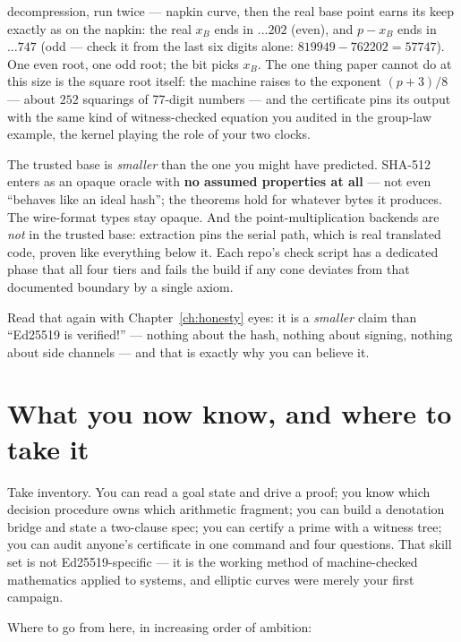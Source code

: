 \begin{worked}{decompression, run twice --- napkin curve, then the real base point}
earns its keep exactly as on the napkin: the real
$x_B$ ends in $\ldots 202$ (even), and $p - x_B$ ends in $\ldots 747$
(odd --- check it from the last six digits alone: $819949 - 762202 =
57747$). One even root, one odd root; the bit picks $x_B$. The one thing
paper cannot do at this size is the square root itself: the machine
raises to the exponent $(p+3)/8$ --- about $252$ squarings of 77-digit
numbers --- and the certificate  pins its
output with the same kind of witness-checked equation you audited in the
group-law example, the kernel playing the role of your two clocks.
\end{worked}

The trusted base is \emph{smaller} than the one you might have predicted.
SHA-512 enters as an opaque oracle with \textbf{no assumed properties at
all} --- not even ``behaves like an ideal hash''; the theorems hold for
whatever bytes it produces. The wire-format types stay opaque. And the
point-multiplication backends are \emph{not} in the trusted base:
extraction pins the serial path, which is real translated code, proven
like everything below it. Each repo's check script has a dedicated phase
that  all four tiers and fails the build if any
cone deviates from that documented boundary by a single axiom.

Read that again with Chapter~\ref{ch:honesty} eyes: it is a
\emph{smaller} claim than ``Ed25519 is verified!'' --- nothing about the
hash, nothing about signing, nothing about side channels --- and that is
exactly why you can believe it.

\section{What you now know, and where to take it}

Take inventory. You can read a goal state and drive a proof; you know which
decision procedure owns which arithmetic fragment; you can build a
denotation bridge and state a two-clause spec; you can certify a prime with
a witness tree; you can audit anyone's certificate in one command and four
questions. That skill set is not Ed25519-specific --- it is the working
method of machine-checked mathematics applied to systems, and elliptic
curves were merely your first campaign.

Where to go from here, in increasing order of ambition:

